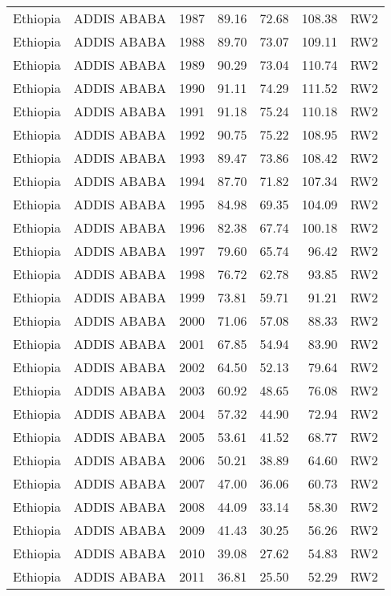 \begin{longtable}{lllrrrl}
  Ethiopia & ADDIS ABABA & 1987 & 89.16 & 72.68 & 108.38 & RW2 \\ 
  Ethiopia & ADDIS ABABA & 1988 & 89.70 & 73.07 & 109.11 & RW2 \\ 
  Ethiopia & ADDIS ABABA & 1989 & 90.29 & 73.04 & 110.74 & RW2 \\ 
  Ethiopia & ADDIS ABABA & 1990 & 91.11 & 74.29 & 111.52 & RW2 \\ 
  Ethiopia & ADDIS ABABA & 1991 & 91.18 & 75.24 & 110.18 & RW2 \\ 
  Ethiopia & ADDIS ABABA & 1992 & 90.75 & 75.22 & 108.95 & RW2 \\ 
  Ethiopia & ADDIS ABABA & 1993 & 89.47 & 73.86 & 108.42 & RW2 \\ 
  Ethiopia & ADDIS ABABA & 1994 & 87.70 & 71.82 & 107.34 & RW2 \\ 
  Ethiopia & ADDIS ABABA & 1995 & 84.98 & 69.35 & 104.09 & RW2 \\ 
  Ethiopia & ADDIS ABABA & 1996 & 82.38 & 67.74 & 100.18 & RW2 \\ 
  Ethiopia & ADDIS ABABA & 1997 & 79.60 & 65.74 & 96.42 & RW2 \\ 
  Ethiopia & ADDIS ABABA & 1998 & 76.72 & 62.78 & 93.85 & RW2 \\ 
  Ethiopia & ADDIS ABABA & 1999 & 73.81 & 59.71 & 91.21 & RW2 \\ 
  Ethiopia & ADDIS ABABA & 2000 & 71.06 & 57.08 & 88.33 & RW2 \\ 
  Ethiopia & ADDIS ABABA & 2001 & 67.85 & 54.94 & 83.90 & RW2 \\ 
  Ethiopia & ADDIS ABABA & 2002 & 64.50 & 52.13 & 79.64 & RW2 \\ 
  Ethiopia & ADDIS ABABA & 2003 & 60.92 & 48.65 & 76.08 & RW2 \\ 
  Ethiopia & ADDIS ABABA & 2004 & 57.32 & 44.90 & 72.94 & RW2 \\ 
  Ethiopia & ADDIS ABABA & 2005 & 53.61 & 41.52 & 68.77 & RW2 \\ 
  Ethiopia & ADDIS ABABA & 2006 & 50.21 & 38.89 & 64.60 & RW2 \\ 
  Ethiopia & ADDIS ABABA & 2007 & 47.00 & 36.06 & 60.73 & RW2 \\ 
  Ethiopia & ADDIS ABABA & 2008 & 44.09 & 33.14 & 58.30 & RW2 \\ 
  Ethiopia & ADDIS ABABA & 2009 & 41.43 & 30.25 & 56.26 & RW2 \\ 
  Ethiopia & ADDIS ABABA & 2010 & 39.08 & 27.62 & 54.83 & RW2 \\ 
  Ethiopia & ADDIS ABABA & 2011 & 36.81 & 25.50 & 52.29 & RW2 \\ 

\end{longtable}
